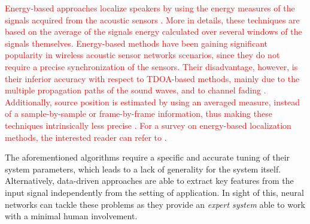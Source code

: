 \documentclass[review]{elsarticle}
\begin{document}
\textcolor{red}{Energy-based approaches localize speakers by using the energy measures of the signals acquired from the acoustic sensors \cite{Cobos2017,Meng2017}. More in details, these techniques are based on the average of the signals energy calculated over several windows of the signals themselves. Energy-based methods have been gaining significant popularity in wireless acoustic sensor networks scenarios, since they do not require a precise synchronization of the sensors. Their disadvantage, however, is their inferior accuracy with respect to TDOA-based methods, mainly due to the multiple propagation paths of the sound waves, and to channel fading \cite{Cobos2017}. Additionally, source position is estimated by using an averaged measure, instead of a sample-by-sample or frame-by-frame information, thus making these techniques intrinsically less precise \cite{Cobos2017}. For a survey on energy-based localization methods, the interested reader can refer to \cite{Cobos2017,Meng2017}.}



The aforementioned algorithms require a specific and accurate tuning of their system parameters, which leads to a lack of generality for the system itself. Alternatively, data-driven approaches are able to extract key features from the input signal independently from the setting of application. In sight of this, neural networks can tackle these problems as they provide an \textit{expert system} able to work with a minimal human involvement. 
\end{document}
